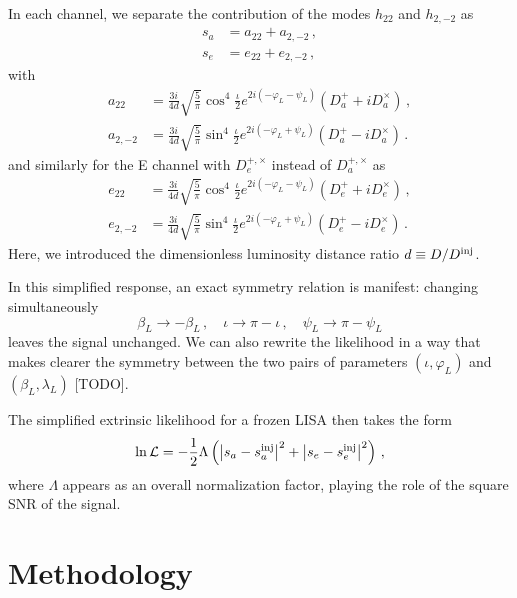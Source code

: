 \documentclass[aps,showpacs,twocolumn,prd,superscriptaddress,nofootinbib]{revtex4}
\newcommand{\be}{\begin{equation}}
\newcommand{\ee}{\end{equation}}
\newcommand{\bsub}{\begin{subequations}}
\newcommand{\esub}{\end{subequations}}
\newcommand\calL{{\mathcal{L}}}
\newcommand\betaL{{\beta_{L}}}
\newcommand\lambdaL{{\lambda_{L}}}
\newcommand\varphiL{{\varphi_{L}}}
\newcommand\psiL{{\psi_{L}}}
\newcommand{\SM}[1]{{\color{Blue} #1}}
\begin{document}
In each channel, we separate the contribution of the modes $h_{22}$ and $h_{2,-2}$ as
\bsub\label{eq:defsase}
\begin{align}
	s_{a} &= a_{22} + a_{2,-2} \,, \\
	s_{e} &= e_{22} + e_{2,-2} \,,
\end{align}
\esub
with
\bsub\label{eq:defa22a2m2}
\begin{align}
	a_{22} &= \frac{3i}{4d} \sqrt{\frac{5}{\pi}} \cos^{4}\frac{\iota}{2} e^{2i(-\varphiL-\psiL)} \left( D_{a}^{+} + i D_{a}^{\times} \right) \,, \\
	a_{2,-2} &= \frac{3i}{4d} \sqrt{\frac{5}{\pi}} \sin^{4}\frac{\iota}{2} e^{2i(-\varphiL+\psiL)} \left( D_{a}^{+} - i D_{a}^{\times} \right) \,.
\end{align}
\esub
and similarly for the E channel with $D_{e}^{+,\times}$ instead of $D_{a}^{+, \times}$ as
\bsub\label{eq:defe22e2m2}
\begin{align}
	e_{22} &= \frac{3i}{4d} \sqrt{\frac{5}{\pi}} \cos^{4}\frac{\iota}{2} e^{2i(-\varphiL-\psiL)} \left( D_{e}^{+} + i D_{e}^{\times} \right) \,, \\
	e_{2,-2} &= \frac{3i}{4d} \sqrt{\frac{5}{\pi}} \sin^{4}\frac{\iota}{2} e^{2i(-\varphiL+\psiL)} \left( D_{e}^{+} - i D_{e}^{\times} \right) \,.
\end{align}
\esub
Here, we introduced the dimensionless luminosity distance ratio $d \equiv D / D^{\rm inj}$.

In this simplified response, an exact symmetry relation is manifest: changing simultaneously
\be\label{eq:symmetryresponse}
\betaL \rightarrow -\betaL\,, \quad \iota \rightarrow \pi - \iota \,, \quad \psiL \rightarrow \pi - \psiL
\ee
leaves the signal unchanged. We can also rewrite the likelihood in a way that makes clearer the symmetry between the two pairs of parameters $(\iota, \varphiL)$ and $(\betaL, \lambdaL)$ \SM{[TODO]}.

The simplified extrinsic likelihood for a frozen LISA then takes the form
\be\label{eq:simplelikelihood}
	\ln \calL = - \frac{1}{2} \Lambda \left( \left| s_{a} - s_{a}^{\rm inj} \right|^{2} + \left| s_{e} - s_{e}^{\rm inj} \right|^{2} \right) \,,
\ee
where $\Lambda$ appears as an overall normalization factor, playing the role of the square SNR of the signal.


\section{Methodology}
\label{sec:method}
\end{document}
